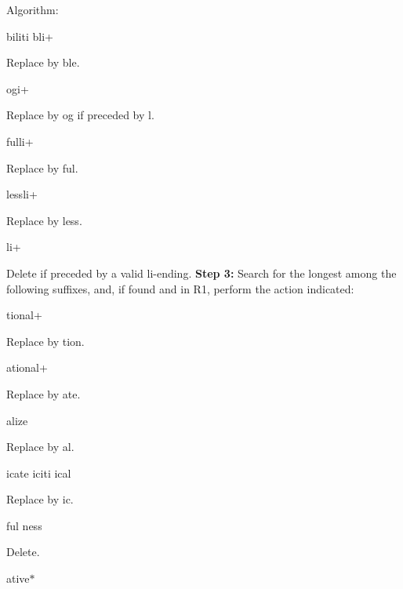 \begin{DoxyParagraph}{Algorithm\+:}
\begin{DoxyItemize}
\begin{DoxyItemize}
\end{DoxyItemize}
\item biliti bli+
\begin{DoxyItemize}
\item Replace by ble.
\end{DoxyItemize}
\item ogi+
\begin{DoxyItemize}
\item Replace by og if preceded by l.
\end{DoxyItemize}
\item fulli+
\begin{DoxyItemize}
\item Replace by ful.
\end{DoxyItemize}
\item lessli+
\begin{DoxyItemize}
\item Replace by less.
\end{DoxyItemize}
\item li+
\begin{DoxyItemize}
\item Delete if preceded by a valid li-\/ending. {\bfseries Step 3\+:} Search for the longest among the following suffixes, and, if found and in R1, perform the action indicated\+:
\end{DoxyItemize}
\item tional+
\begin{DoxyItemize}
\item Replace by tion.
\end{DoxyItemize}
\item ational+
\begin{DoxyItemize}
\item Replace by ate.
\end{DoxyItemize}
\item alize
\begin{DoxyItemize}
\item Replace by al.
\end{DoxyItemize}
\item icate iciti ical
\begin{DoxyItemize}
\item Replace by ic.
\end{DoxyItemize}
\item ful ness
\begin{DoxyItemize}
\item Delete.
\end{DoxyItemize}
\item ative$\ast$

\end{DoxyItemize}
\end{DoxyParagraph}
